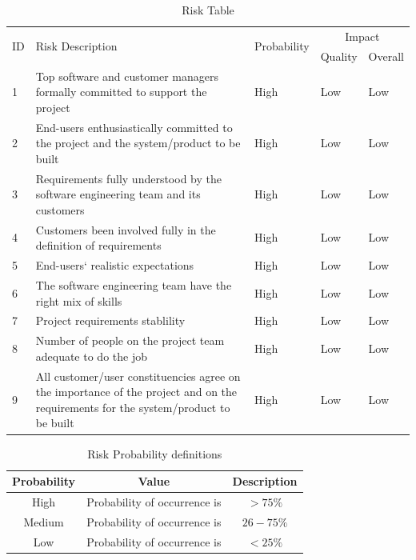 \documentclass[12pt,a4paper]{report}
\begin{document}
\begin{table}[!h]
	\center
	
		\begin{tabular}{|p{0.5cm}|p{7.5cm}|p{2cm}|p{1.5cm}|p{1.5cm}|}
			\hline
			\multirow{2}{*}{ID} & \multirow{2}{*}{Risk Description}	& \multirow{2}{*}{Probability} & \multicolumn{2}{|c|}{Impact} \\ \cline{4-5}
			& & &	 Quality	& Overall \\ \hline
			1	& Top software and customer managers formally committed to support the project& High	& Low	& Low \\ \hline
			2	& End-users enthusiastically committed to the project and the system/product to be built	& High	& Low	&Low \\ \hline
			3 & Requirements fully understood by the software engineering team and its customers& High	& Low	& Low \\ \hline
			4	& Customers been involved fully in the definition of requirements	& High	& Low	& Low \\ \hline
			5	& End-users` realistic expectations	& High	& Low	& Low \\ \hline
			6 & The software engineering team have the right mix of skills& High	& Low	& Low \\ \hline
			7 & Project requirements stablility& High	& Low	& Low \\ \hline
			8 & Number of people on the project team adequate to do the job& High	& Low	&Low \\ \hline
			9 & All customer/user constituencies agree on the importance of the project and on the requirements for the system/product to be built& High	& Low	& Low \\ \hline
		\end{tabular}
	\caption{Risk Table}

\end{table}
	
\begin{table}[!h]
		\center
			\begin{tabular}{| c | c | c |}
				\hline
				Probability & Value &	Description \\ \hline
				High &	Probability of occurrence is &  $ > 75 \% $ \\ \hline
				Medium &	Probability of occurrence is  & $26-75 \% $ \\ \hline
				Low	& Probability of occurrence is & $ < 25 \% $ \\ \hline
			\end{tabular}
		\caption{Risk Probability definitions}
	\end{table}
	
\end{document}
